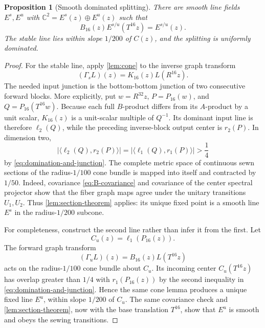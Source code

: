 \documentclass[11pt,reqno]{amsart}
\numberwithin{equation}{section}
\newtheorem{proposition}[theorem]{Proposition}
\theoremstyle{definition}
\newcommand{\C}{\mathbb C}
\newcommand{\ip}[2]{\langle #1,#2\rangle}
\begin{document}
\begin{proposition}[Smooth dominated splitting]\label{prop:splitting}
There are smooth line fields $E^s,E^u$ with
$\C^2=E^s(z)\oplus E^u(z)$ such that
\begin{equation}\label{eq:N-invariance}
 B_{16}(z)E^{s/u}(T^{16}z)=E^{s/u}(z).
\end{equation}
The stable line lies within slope $1/200$ of $C(z)$, and the splitting is
uniformly dominated.
\end{proposition}

\begin{proof}
For the stable line, apply \cref{lem:cone} to the inverse graph transform
\[
 (\Gamma_s L)(z)=K_{16}(z)L(R^{16}z).
\]
The needed input junction is the bottom-bottom junction of two consecutive
forward blocks.  More explicitly, put $w=R^{32}z$,
$P=P_{16}(w)$, and $Q=P_{16}(T^{16}w)$.  Because each full $B$-product
differs from its $A$-product by a unit scalar, $K_{16}(z)$ is a unit-scalar
multiple of $Q^{-1}$.  Its dominant input line is therefore $\ell_2(Q)$,
while the preceding inverse-block output center is $r_2(P)$.  In dimension
two,
\[
 |\ip{\ell_2(Q)}{r_2(P)}|
 =|\ip{\ell_1(Q)}{r_1(P)}|>\frac14
\]
by \eqref{eq:domination-and-junction}.  The complete metric space of
continuous sewn sections of the radius-$1/100$ cone bundle is mapped into
itself and contracted by $1/50$.  Indeed, covariance
\eqref{eq:B-covariance} and covariance of the center spectral projector show
that the fiber graph maps agree under the unitary transitions $U_1,U_2$.
Thus \cref{lem:section-theorem} applies: its unique fixed point is a smooth
line $E^s$ in the radius-$1/200$ subcone.

For completeness, construct the second line rather than infer it from the
first.  Let
\[
 C_u(z)=\ell_1(P_{16}(z)).
\]
The forward graph transform
\[
 (\Gamma_u L)(z)=B_{16}(z)L(T^{16}z)
\]
acts on the radius-$1/100$ cone bundle about $C_u$.  Its incoming center
$C_u(T^{16}z)$ has overlap greater than $1/4$ with
$r_1(P_{16}(z))$ by the second inequality in
\eqref{eq:domination-and-junction}.  Hence the same cone lemma produces a
unique fixed line $E^u$, within slope $1/200$ of $C_u$.  The same covariance
check and \cref{lem:section-theorem}, now with the base translation $T^{16}$,
show that $E^u$ is smooth and obeys the sewing transitions.


\end{proof}
\end{document}
